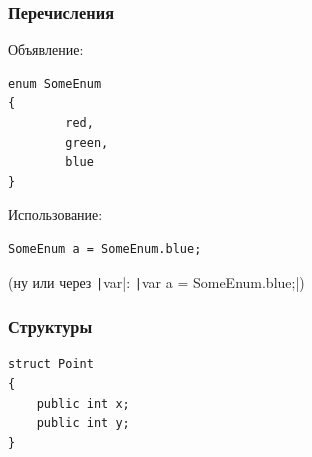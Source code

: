 \documentclass[xetex,mathserif,serif]{beamer}
\begin{document}
	\begin{frame}[fragile]
		\frametitle{Перечисления}
		Объявление:
		\begin{verbatim}
enum SomeEnum
{
        red,
        green,
        blue
}
		\end{verbatim}
		Использование:
		\begin{verbatim}
SomeEnum a = SomeEnum.blue;
		\end{verbatim}
		(ну или через \texttt|var|: \texttt|var a = SomeEnum.blue;|)
	\end{frame}

	\begin{frame}[fragile]
		\frametitle{Структуры}
		\begin{verbatim}
struct Point
{
    public int x;
    public int y;
}
		\end{verbatim}
	\end{frame}
\end{document}
